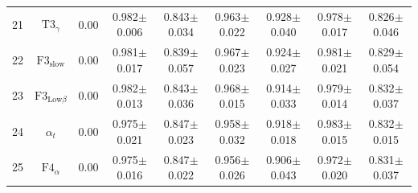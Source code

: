 \documentclass[pdflatex,sn-mathphys]{sn-jnl}%
\theoremstyle{thmstyleone}%
\theoremstyle{thmstyletwo}%
\theoremstyle{thmstylethree}%
\begin{document}
\begin{appendices}
\begin{table}[h!]
{\begin{tabular}{r|cccccccc}
  21 &          $\text{T3}_{\gamma}$ &   0.00 &          0.982$\pm$0.006 &          0.843$\pm$0.034 &          0.963$\pm$0.022 &          0.928$\pm$0.040 &          0.978$\pm$0.017 &          0.826$\pm$0.046 \\
  22 &       $\text{F3}_\text{slow}$ &   0.00 &          0.981$\pm$0.017 &          0.839$\pm$0.057 &          0.967$\pm$0.023 &          0.924$\pm$0.027 &          0.981$\pm$0.021 &          0.829$\pm$0.054 \\
  23 & $\text{F3}_{\text{Low}\beta}$ &   0.00 &          0.982$\pm$0.013 &          0.843$\pm$0.036 &          0.968$\pm$0.015 &          0.914$\pm$0.033 &          0.979$\pm$0.014 &          0.832$\pm$0.037 \\
  24 &                  $\alpha_{t}$ &   0.00 &          0.975$\pm$0.021 &          0.847$\pm$0.023 &          0.958$\pm$0.032 &          0.918$\pm$0.018 &          0.983$\pm$0.015 &          0.832$\pm$0.015 \\
  25 &          $\text{F4}_{\alpha}$ &   0.00 &          0.975$\pm$0.016 &          0.847$\pm$0.022 &          0.956$\pm$0.026 &          0.906$\pm$0.043 &          0.972$\pm$0.020 &          0.831$\pm$0.037 \\
\hline
\end{tabular}
}
\end{table}




\end{appendices}
\end{document}
